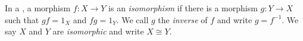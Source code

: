 

\begin{dfn*}[Isomorphism]
	In a , a morphism $f: X\rightarrow Y$ is an \emph{isomorphism} if
	there is a morphism $g: Y\rightarrow X$ such that $gf = 1_X$ and $fg = 1_Y$.
	We call $g$ the \emph{inverse} of $f$ and write $g = f^{-1}$. We say $X$ and
	$Y$ are \emph{isomorphic} and write $X\cong Y$.
\end{dfn*}



